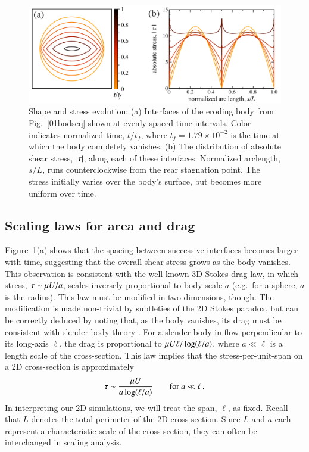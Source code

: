 \documentclass[preprint, 10pt]{elsarticle}
\begin{document}
\begin{figure}%
\begin{center}
\includegraphics[width = 0.8 \textwidth]{./figs/shrink_intface.pdf}
\caption{
Shape and stress evolution: (a) Interfaces of the eroding body from Fig.~\ref{01bodseq} shown at evenly-spaced time intervals. Color indicates normalized time, $t/t_f$, where $t_f = 1.79 \times 10^{-2}$ is the time at which the body completely vanishes. (b) The distribution of absolute shear stress, $\lvert \tau \rvert$, along each of these interfaces. Normalized arclength, $s/L$, runs counterclockwise from the rear stagnation point. The stress initially varies over the body's surface, but becomes more uniform over time.}
\label{shrink_intface}
\end{center}
\end{figure}

\subsection{Scaling laws for area and drag}
\label{sec:scaling}

Figure~\ref{shrink_intface}(a) shows that the spacing between successive interfaces becomes larger with time, suggesting that the overall shear stress grows as the body vanishes. This observation is consistent with the well-known 3D Stokes drag law, in which stress, $\tau \sim \mu U / a$, scales inversely proportional to body-scale $a$ (e.g.~for a sphere, $a$ is the radius). This law must be modified in two dimensions, though. The modification is made non-trivial by subtleties of the 2D Stokes paradox, but can be correctly deduced by noting that, as the body vanishes, its drag must be consistent with slender-body theory \cite{batchelor1970slender, MooreJFM2012}. 
For a slender body in flow perpendicular to its long-axis $\ell$, the drag is proportional to
$\mu U \ell/ \log(\ell/a)$, where $a \ll \ell $ is a length scale of the cross-section. This law implies that the stress-per-unit-span on a 2D cross-section is approximately
\begin{align}
  \label{eqn:stresslaw}
  \tau \sim \frac{\mu U}{a \log(\ell/a)} \qquad \text{for } a \ll \ell \, .
\end{align}
In interpreting our 2D simulations, we will treat the span, $\ell$, as
fixed. Recall that $L$ denotes the total perimeter of the 2D cross-section. Since $L$ and $a$ each represent a characteristic scale of the cross-section, they can often be interchanged in scaling analysis.
\end{document}
